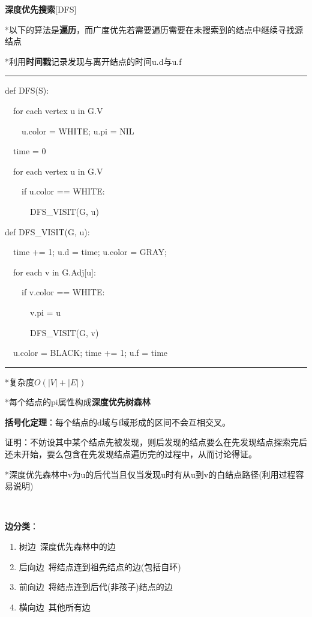 \documentclass[a4paper,UTF8,fontset=windows]{ctexart}
\newenvironment{code}{\rule{36em}{0.1em}\setlength{\parindent}{1em}

}{

\setlength{\parindent}{0em}\rule{36em}{0.1em}}
\begin{document}
\textbf{深度优先搜索}[DFS]

*\hspace{0em}以下的算法是\textbf{遍历}，而广度优先若需要遍历需要在未搜索到的结点中继续寻找源结点

*\hspace{0em}利用\textbf{时间戳}记录发现与离开结点的时间u.d与u.f

\begin{code}
def DFS(S):

\ \ for each vertex u in G.V

\ \ \ \ u.color = WHITE; u.pi = NIL

\ \ time = 0

\ \ for each vertex u in G.V

\ \ \ \ if u.color == WHITE:

\ \ \ \ \ \ DFS\_VISIT(G, u)

def DFS\_VISIT(G, u):

\ \ time += 1; u.d = time; u.color = GRAY;

\ \ for each v in G.Adj[u]:

\ \ \ \ if v.color == WHITE:

\ \ \ \ \ \ v.pi = u

\ \ \ \ \ \ DFS\_VISIT(G, v)

\ \ u.color = BLACK; time += 1; u.f = time
\end{code}

*\hspace{0em}复杂度$O(|V|+|E|)$

*\hspace{0em}每个结点的pi属性构成\textbf{深度优先树森林}

\textbf{括号化定理}：每个结点的d域与f域形成的区间不会互相交叉。

证明：不妨设其中某个结点先被发现，则后发现的结点要么在先发现结点探索完后还未开始，要么包含在先发现结点遍历完的过程中，从而讨论得证。

*\hspace{0em}深度优先森林中v为u的后代当且仅当发现u时有从u到v的白结点路径(利用过程容易说明)

\

\textbf{边分类}：
\begin{enumerate}
    \item 树边\ 深度优先森林中的边
    \item 后向边\ 将结点连到祖先结点的边(包括自环)
    \item 前向边\ 将结点连到后代(非孩子)结点的边
    \item 横向边\ 其他所有边
\end{enumerate}
\end{document}
